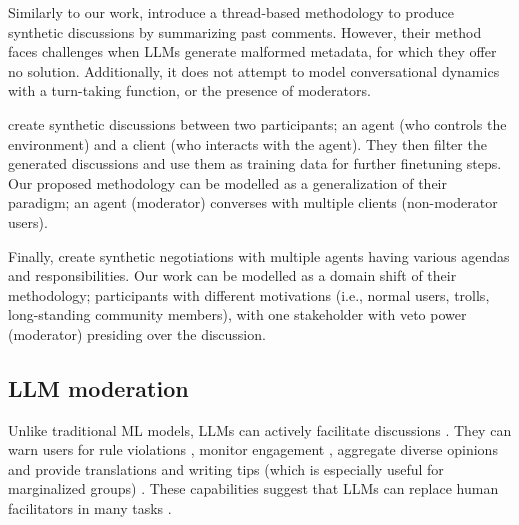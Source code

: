 Similarly to our work, \citet{balog_2024} introduce a thread-based methodology to produce synthetic discussions by summarizing past comments. However, their method faces challenges when \acp{LLM} generate malformed metadata, for which they offer no solution. Additionally, it does not attempt to model conversational dynamics with a turn-taking function, or the presence of moderators.

\citet{ulmer2024} create synthetic discussions between two participants; an agent (who controls the environment) and a client (who interacts with the agent). They then filter the generated discussions and use them as training data for further finetuning steps. Our proposed methodology can be modelled as a generalization of their paradigm; an agent (moderator) converses with multiple clients (non-moderator users).

Finally, \citet{abdelnabi_negotiations} create synthetic negotiations with multiple agents having various agendas and responsibilities. Our work can be modelled as a domain shift of their methodology; participants with different motivations (i.e., normal users, trolls, long-standing community members), with one stakeholder with veto power (moderator) presiding over the discussion.


\subsection{LLM moderation}

Unlike traditional \ac{ML} models, \acp{LLM} can actively facilitate discussions \cite{korre2025evaluation}. They can warn users for rule violations \cite{Kumar_AbuHashem_Durumeric_2024}, monitor engagement \cite{schroeder-etal-2024-fora}, aggregate diverse opinions \cite{small-polis-llm} and provide translations and writing tips (which is especially useful for marginalized groups) \cite{Tsai2024Generative}. These capabilities suggest that \acp{LLM} can replace human facilitators in many tasks \cite{seering_self_moderation}.

